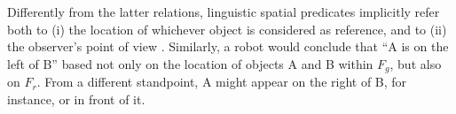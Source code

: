 \documentclass{article}
\begin{document}
Differently from the latter relations, linguistic spatial predicates implicitly refer both to (i) the location of whichever object is considered as reference, and to (ii) the observer's point of view \cite{landau_what_1993}. Similarly, a robot would conclude that ``A is on the left of B'' based not only on the location of objects A and B within $F_g$, but also on $F_r$. From a different standpoint, A might appear on the right of B, for instance, or in front of it.
\end{document}
